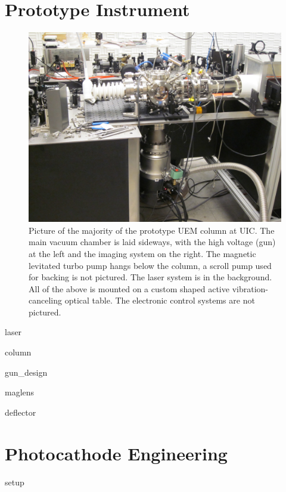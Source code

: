 \documentclass{uicthesi}
\begin{document}
\chapter{Prototype Instrument}

  \begin{figure}
    \centering
    \includegraphics{inc/hardware/column.jpg}
    \caption[Picture of the prototype UEM column at UIC]{
      Picture of the majority of the prototype UEM column at UIC.
      The main vacuum chamber is laid sideways, with the high voltage (gun) at the left and the imaging system on the right.
      The magnetic levitated turbo pump hangs below the column, a scroll pump used for backing is not pictured.
      The laser system is in the background.
      All of the above is mounted on a custom shaped active vibration-canceling optical table.
      The electronic control systems are not pictured.
    }
    \label{fig:column-pic}
  \end{figure}

  {laser}

  {column}

  {gun_design}

  {maglens}

  {deflector}

\chapter{Photocathode Engineering}

  {setup}
\end{document}
